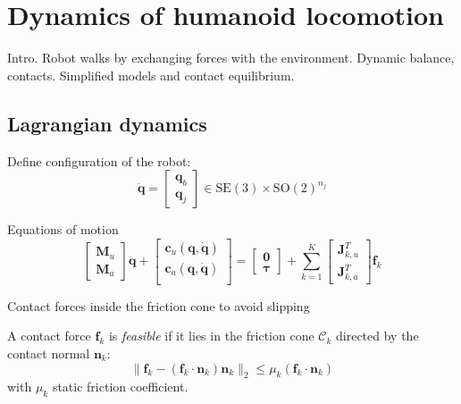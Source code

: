 \chapter{Dynamics of humanoid locomotion}
Intro. Robot walks by exchanging forces with the environment. Dynamic balance, contacts. Simplified models and contact equilibrium.

\section{Lagrangian dynamics}
\label{sec:lagrangian-dynamics}
Define configuration of the robot:
\begin{equation*}
    \ddot{\bm{q}} =
    \begin{bmatrix}
        \bm{q}_b \\ \bm{q}_j
    \end{bmatrix} \in \mathrm{SE}(3) \times \mathrm{SO}(2)^{n_j}
\end{equation*}

Equations of motion
\begin{equation}
    \begin{bmatrix}
        \bm{M}_u \\ \bm{M}_a
    \end{bmatrix} \ddot{\bm{q}} +
    \begin{bmatrix}
        \bm{c}_u(\bm{q}, \dot{\bm{q}}) \\
        \bm{c}_a(\bm{q}, \dot{\bm{q}}) \\
    \end{bmatrix} =
    \begin{bmatrix}
        \bm{0} \\ \bm{\tau}
    \end{bmatrix} +
    \sum_{k=1}^{K}
    \begin{bmatrix}
        \bm{J}_{k, u}^T \\ \bm{J}_{k, a}^T
    \end{bmatrix}
    \bm{f}_k
    \label{eq:equation-of-motion-humanoids}
\end{equation}

Contact forces inside the friction cone to avoid slipping

A contact force $\bm{f}_k$ is \textit{feasible} if it lies in the friction cone $\mathcal{C}_k$ directed by the contact normal $\bm{n}_k$:
\begin{equation}
    \label{eq:feasible-contact-force}
    \| \bm{f}_k - (\bm{f}_k \cdot \bm{n}_k) \bm{n}_k \|_2 \le \mu_k (\bm{f}_k \cdot \bm{n}_k)
\end{equation}
with $\mu_k$ static friction coefficient.

